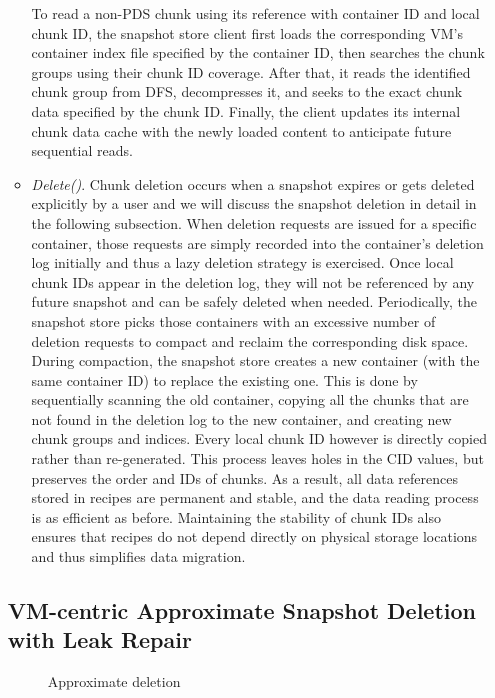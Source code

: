 \begin{itemize}
\begin{itemize}
To read a non-PDS chunk using its reference with container ID and local chunk ID,  the snapshot store client first loads the
corresponding VM's container index file specified by the container ID, then searches the chunk
groups  using their  chunk ID coverage.
After that, it reads the identified chunk group from DFS, decompresses it, and seeks to the exact chunk data 
specified by the chunk ID. 
Finally, the client updates its internal chunk data cache with the newly loaded content to 
anticipate future sequential reads.
\item {\em Delete()}.
Chunk deletion occurs when a snapshot expires or gets deleted explicitly by a user
and we will discuss the snapshot deletion in detail in the following subsection.
When deletion requests are issued for a specific container,
those requests are simply recorded into the  container's deletion log initially and thus  a lazy
deletion strategy is exercised.
Once local chunk IDs appear in
the deletion log, they will not be referenced by any future snapshot and can be safely deleted when needed. 
Periodically, the snapshot  store picks those containers with an excessive
number of deletion requests to  compact and  reclaim the corresponding disk space. 
During compaction, the snapshot store creates a new container (with the same container ID) to replace the 
existing one. This is done by sequentially scanning the old container, copying all the chunks that are not 
found in the deletion log to the new container, and creating new chunk groups and indices. 
Every local chunk ID however is directly copied rather than re-generated. This
process leaves holes in the CID values, but preserves the order and IDs of chunks.
As a result, all data references stored 
in recipes are permanent and stable, and the data reading process
is as efficient as before. Maintaining the stability of chunk IDs also ensures that recipes do not
depend directly on physical storage locations and thus simplifies data migration.
\end{itemize}


\subsection{ VM-centric Approximate Snapshot Deletion with Leak Repair}
\label{sect:delete}

\begin{figure}[htbp]
  \centering
  \caption{Approximate deletion}
  \label{fig:deletion_flow}
\end{figure}


\end{itemize}
